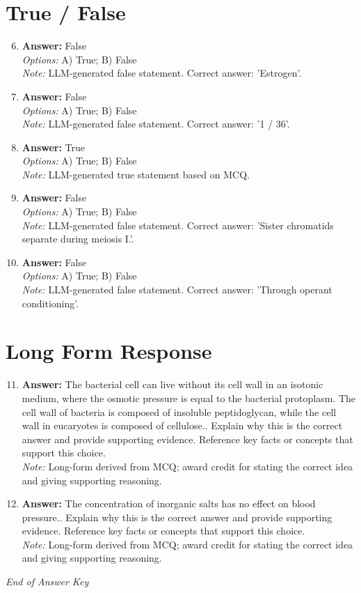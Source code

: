\documentclass[12pt]{article}
\begin{document}
\section*{True / False}
\begin{enumerate}[label=\arabic*.]
\setcounter{enumi}{5}
\item \textbf{Answer:} False
\\ \textit{Options:} A) True; B) False
\\ \textit{Note:} LLM-generated false statement. Correct answer: 'Estrogen'.
\item \textbf{Answer:} False
\\ \textit{Options:} A) True; B) False
\\ \textit{Note:} LLM-generated false statement. Correct answer: '1 / 36'.
\item \textbf{Answer:} True
\\ \textit{Options:} A) True; B) False
\\ \textit{Note:} LLM-generated true statement based on MCQ.
\item \textbf{Answer:} False
\\ \textit{Options:} A) True; B) False
\\ \textit{Note:} LLM-generated false statement. Correct answer: 'Sister chromatids separate during meiosis I.'.
\item \textbf{Answer:} False
\\ \textit{Options:} A) True; B) False
\\ \textit{Note:} LLM-generated false statement. Correct answer: 'Through operant conditioning'.
\end{enumerate}

\section*{Long Form Response}
\begin{enumerate}[label=\arabic*.]
\setcounter{enumi}{10}
\item \textbf{Answer:} The bacterial cell can live without its cell wall in an isotonic medium, where the osmotic pressure is equal to the bacterial protoplasm. The cell wall of bacteria is composed of insoluble peptidoglycan, while the cell wall in eucaryotes is composed of cellulose.. Explain why this is the correct answer and provide supporting evidence. Reference key facts or concepts that support this choice.
\\ \textit{Note:} Long-form derived from MCQ; award credit for stating the correct idea and giving supporting reasoning.
\item \textbf{Answer:} The concentration of inorganic salts has no effect on blood pressure.. Explain why this is the correct answer and provide supporting evidence. Reference key facts or concepts that support this choice.
\\ \textit{Note:} Long-form derived from MCQ; award credit for stating the correct idea and giving supporting reasoning.
\end{enumerate}

\vfill
\noindent\textit{End of Answer Key}
\end{document}

